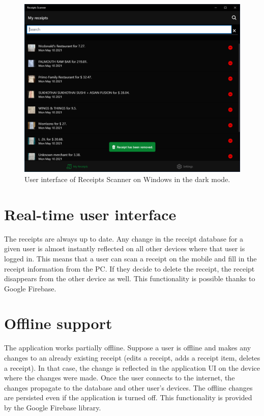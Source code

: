 \documentclass[
  printed, %
  table,   %
  oneside, %
  lof,     %
  lot,     %
]{fithesis3}
\begin{document}
\begin{figure}[H]
    \begin{center}
        \includegraphics[width=\textwidth]{figures/screens/windows/dark/remove_receipt_toast}
    \end{center}
    \caption{User interface of Receipts Scanner on Windows in the dark mode.}
    \label{fig:dark_mode_windows}
\end{figure}

\section{Real-time user interface}
The receipts are always up to date. Any change in the receipt database for a given user is almost instantly reflected on all other devices where that user is logged in. This means that a user can scan a receipt on the mobile and fill in the receipt information from the PC. If they decide to delete the receipt, the receipt disappears from the other device as well.
This functionality is possible thanks to Google Firebase.

\section{Offline support}
The application works partially offline. Suppose a user is offline and makes any changes to an already existing receipt (edits a receipt, adds a receipt item, deletes a receipt). In that case, the change is reflected in the application UI on the device where the changes were made. Once the user connects to the internet, the changes propagate to the database and other user's devices. The offline changes are persisted even if the application is turned off. This functionality is provided by the Google Firebase library.
\end{document}
